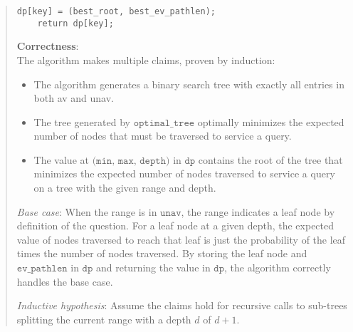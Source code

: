 \documentclass[11pt]{article}
\newcommand{\code}[1]{$\texttt{#1}$}
\begin{document}
\begin{enumerate}
\begin{quote}
\begin{Verbatim}[xleftmargin=-6em]
    dp[key] = (best_root, best_ev_pathlen);
    return dp[key];
\end{Verbatim}

\medskip
\textbf{Correctness}: \\
The algorithm makes multiple claims, proven by induction:
\begin{itemize}
  \item The algorithm generates a binary search tree with exactly all entries in both av and unav.
  \item The tree generated by \code{optimal\_tree} optimally minimizes the expected number of nodes that must be traversed to service a query.
  \item The value at \code{(min, max, depth)} in \code{dp} contains the root of the tree that minimizes the expected number of nodes traversed to service a query on a tree with the given range and depth.
\end{itemize}

\textit{Base case}: When the range is in \code{unav}, the range indicates a leaf node by definition of the question. For a leaf node at a given depth, the expected value of nodes traversed to reach that leaf is just the probability of the leaf times the number of nodes traversed. By storing the leaf node and \code{ev\_pathlen} in \code{dp} and returning the value in \code{dp}, the algorithm correctly handles the base case.

\medskip
\textit{Inductive hypothesis}: Assume the claims hold for recursive calls to sub-trees splitting the current range with a depth $d$ of $d + 1$.


\end{quote}
\end{enumerate}
\end{document}
